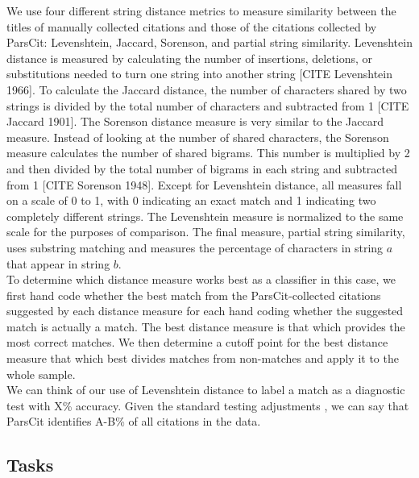 \documentclass[12pt]{article}
\begin{document}
We use four different string distance metrics to measure similarity between the titles of manually collected citations and those of the citations collected by ParsCit: Levenshtein, Jaccard, Sorenson, and partial string similarity. Levenshtein distance is measured by calculating the number of insertions, deletions, or substitutions needed to turn one string into another string [CITE Levenshtein 1966]. To calculate the Jaccard distance, the number of characters shared by two strings is divided by the total number of characters and subtracted from 1 [CITE Jaccard 1901]. The Sorenson distance measure is very similar to the Jaccard measure. Instead of looking at the number of shared characters, the Sorenson measure calculates the number of shared bigrams. This number is multiplied by 2 and then divided by the total number of bigrams in each string and subtracted from 1 [CITE Sorenson 1948]. Except for Levenshtein distance, all measures fall on a scale of 0 to 1, with 0 indicating an exact match and 1 indicating two completely different strings. The Levenshtein measure is normalized to the same scale for the purposes of comparison. The final measure, partial string similarity, uses substring matching and measures the percentage of characters in string $a$ that appear in string $b$.\\

To determine which distance measure works best as a classifier in this case, we first hand code whether the best match from the ParsCit-collected citations suggested by each distance measure for each hand coding whether the suggested match is actually a match. The best distance measure is that which provides the most correct matches. We then determine a cutoff point for the best distance measure that which best divides matches from non-matches and apply it to the whole sample.\\


We can think of our use of Levenshtein distance to label a match as a diagnostic test with X\% accuracy. Given the standard testing adjustments \cite{pewsner2004}, we can say that ParsCit identifies A-B\% of all citations in the data.


\subsection{Tasks}
\end{document}

